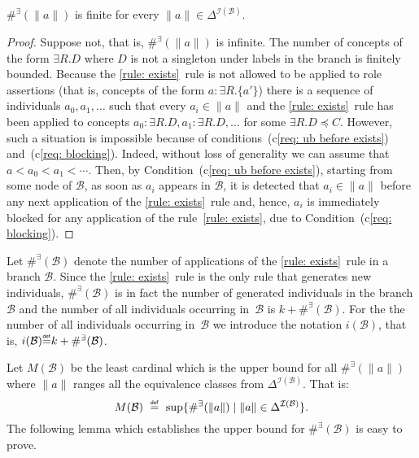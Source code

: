 \documentclass[leqno
,pdflatex
,prodmode
,acmtocl
]{acmsmall}
\makeatletter
\newcommand{\mathcmd}[1]{\ensuremath{#1}\xspace}
\newcommand{\metasmbfont}{\mathsf}
\def\@define#1{\mathcmd{\stackrel {\mbox{\tiny\ensuremath{\metasmbfont{def}}}}{{#1}}}}
\def\sm@shdefine#1{\smash[t]{\@define{#1}}}
\newcommand{\define}{\mathchoice{\@define{\ =\ }}{\sm@shdefine{=}}{\sm@shdefine{=}}{\sm@shdefine{=}}}
\newcommand{\branch}[1]{\seg{#1}}
\newcommand{\seg}[1]{\mathcmd{\mathcal{#1}}}
\newcommand{\indiv}{a}
\newcommand{\I}{\mathcal{I}}
\newcommand{\napplE}{\#^\exists}
\newcommand{\IB}{{\I(\branch{B})}}
\makeatother
\begin{document}
\begin{lemma}\label{lemma: napplE(ell)}
$\napplE(\|\indiv\|)$ is finite for every $\|\indiv\|\in\Delta^\IB$.
\end{lemma}
\begin{proof}
Suppose not, that is, $\napplE(\|\indiv\|)$ is infinite.
The number of concepts of the form $\exists R.D$
where $D$ is not a singleton under labels in the branch is finitely bounded.
Because the \eqref{rule: exists}~rule
is not allowed to be applied to
role assertions (that is, concepts of the form $\indiv:\exists R.\{\indiv'\}$)
there is a sequence of individuals
$\indiv_0,\indiv_1,\ldots$ such that every
$\indiv_i\in\|\indiv\|$ and
the \eqref{rule: exists}~rule has been applied
to concepts $\indiv_0:\exists R.D, \indiv_1:\exists R.D,\ldots$
for some $\exists R.D\preceq C$.
However, such a situation is impossible because of
conditions~(c\ref{req: ub before exists}) and~(c\ref{req: blocking}).
Indeed, without loss of generality we can assume that $\indiv<\indiv_0<\indiv_1<\cdots$.
Then, 
by Condition~(c\ref{req: ub before exists}),
starting from some node of $\branch{B}$,
as soon as $\indiv_i$ appears in $\branch{B}$,
it is detected that $\indiv_i\in\|\indiv\|$
before any next
application of the \eqref{rule: exists}~rule
and, hence, $\indiv_i$ is immediately blocked for any application
of the rule~\eqref{rule: exists}, due to Condition~(c\ref{req: blocking}).
\end{proof}

Let $\napplE(\branch{B})$ denote the number of applications
of the \eqref{rule: exists}~rule
in a branch $\branch{B}$.
Since the \eqref{rule: exists}~rule is the
only rule that generates new individuals, 
$\napplE(\branch{B})$ is in fact the number of generated
individuals in the branch $\branch{B}$
and the number of all individuals occurring in~$\branch{B}$ 
is $k+\napplE(\branch{B})$.
For the the number of all individuals occurring in~$\branch{B}$
we introduce the notation 
$i(\branch{B})$, that is, $i(\branch{B})\define k+\napplE(\branch{B})$.

Let $M(\branch{B})$ be the least cardinal 
which is the upper bound for all $\napplE(\|\indiv\|)$ 
where $\|\indiv\|$ ranges all the equivalence classes from $\Delta^\IB$.
That is:
\[M(\branch{B})\define\sup\{\napplE(\|\indiv\|)\mid\|\indiv\|\in\Delta^\IB\}.\]
The following lemma which establishes the upper bound for $\napplE(\branch{B})$ is easy to prove.
\end{document}
